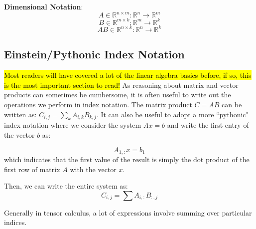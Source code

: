 \textbf{Dimensional Notation}:
\begin{equation}
    A \in \mathbb{R}^{n \times m} : \mathbb{R}^n \to \mathbb{R}^m
\end{equation}
\begin{equation}
    B \in \mathbb{R}^{m \times k} : \mathbb{R}^m \to \mathbb{R}^k
\end{equation}
\begin{equation}
    AB \in \mathbb{R}^{n \times k} : \mathbb{R}^n \to \mathbb{R}^k
\end{equation}





\subsection{Einstein/Pythonic Index Notation}
\hl{Most readers will have covered a lot of the linear algebra basics before, if so, this is the most important section to read!}
As reasoning about matrix and vector products can sometimes be cumbersome, it is often useful to write out the operations we perform in index notation. The matrix product $C = AB$ can be written as: $C_{i,j} = \sum_k A_{i,k}B_{k,j}$. It can also be useful to adopt a more ``pythonic" index notation where we consider the system $Ax = b$ and write the first entry of the vector $b$ as:


\begin{equation}
    A_{1,:}x = b_1
\end{equation}
which indicates that the first value of the result is simply the dot product of the first row of matrix $A$ with the vector $x$.

Then, we can write the entire system as:
\begin{equation}
    C_{i,j} = \sum A_{i,:}B_{:,j}
\end{equation}




Generally in tensor calculus, a lot of expressions involve summing over particular indices.

